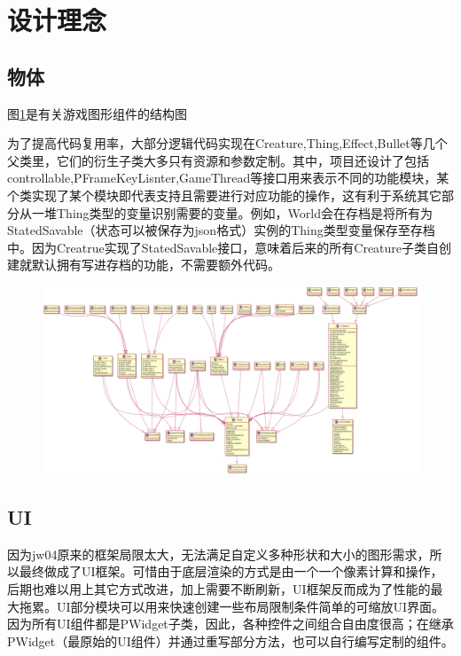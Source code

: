 \documentclass{SCIS2022cn}
\begin{document}
\section{设计理念}
\subsection{物体}
图\ref{graphics.pu}是有关游戏图形组件的结构图\par
为了提高代码复用率，大部分逻辑代码实现在Creature,Thing,Effect,Bullet等几个父类里，它们的衍生子类大多只有资源和参数定制。其中，项目还设计了包括controllable,PFrameKeyLisnter,GameThread等接口用来表示不同的功能模块，某个类实现了某个模块即代表支持且需要进行对应功能的操作，这有利于系统其它部分从一堆Thing类型的变量识别需要的变量。例如，World会在存档是将所有为StatedSavable（状态可以被保存为json格式）实例的Thing类型变量保存至存档中。因为Creatrue实现了StatedSavable接口，意味着后来的所有Creature子类自创建就默认拥有写进存档的功能，不需要额外代码。
	\begin{figure}[!t]
		\centering
		\includegraphics[width=1.0\textwidth]{img/graphics.png}
		\label{graphics.pu}
	\end{figure}
\subsection{UI}
因为jw04原来的框架局限太大，无法满足自定义多种形状和大小的图形需求，所以最终做成了UI框架。可惜由于底层渲染的方式是由一个一个像素计算和操作，后期也难以用上其它方式改进，加上需要不断刷新，UI框架反而成为了性能的最大拖累。UI部分模块可以用来快速创建一些布局限制条件简单的可缩放UI界面。因为所有UI组件都是PWidget子类，因此，各种控件之间组合自由度很高；在继承PWidget（最原始的UI组件）并通过重写部分方法，也可以自行编写定制的组件。
\end{document}

